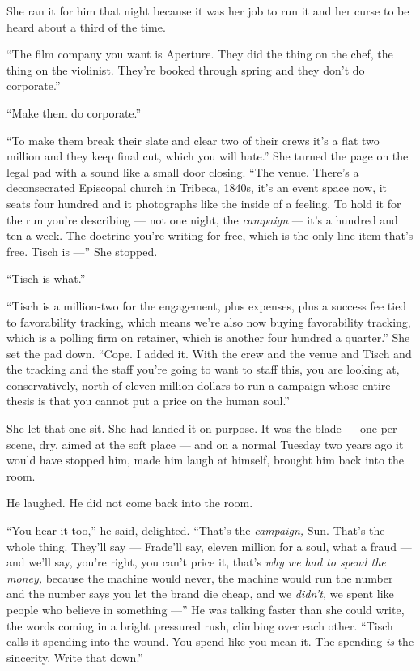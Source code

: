 \documentclass[11pt,openany]{book}
\newcommand{\scenebreak}{\par\vspace{0.5\baselineskip}\begin{center}\textasteriskcentered\quad\textasteriskcentered\quad\textasteriskcentered\end{center}\vspace{0.5\baselineskip}\par}
\begin{document}
\scenebreak


She ran it for him that night because it was her job to run it and her curse to be heard about a third of the time.

``The film company you want is Aperture. They did the thing on the chef, the thing on the violinist. They're booked through spring and they don't do corporate.''

``Make them do corporate.''

``To make them break their slate and clear two of their crews it's a flat two million and they keep final cut, which you will hate.'' She turned the page on the legal pad with a sound like a small door closing. ``The venue. There's a deconsecrated Episcopal church in Tribeca, 1840s, it's an event space now, it seats four hundred and it photographs like the inside of a feeling. To hold it for the run you're describing --- not one night, the \textit{campaign} --- it's a hundred and ten a week. The doctrine you're writing for free, which is the only line item that's free. Tisch is ---'' She stopped.

``Tisch is what.''

``Tisch is a million-two for the engagement, plus expenses, plus a success fee tied to favorability tracking, which means we're also now buying favorability tracking, which is a polling firm on retainer, which is another four hundred a quarter.'' She set the pad down. ``Cope. I added it. With the crew and the venue and Tisch and the tracking and the staff you're going to want to staff this, you are looking at, conservatively, north of eleven million dollars to run a campaign whose entire thesis is that you cannot put a price on the human soul.''

She let that one sit. She had landed it on purpose. It was the blade --- one per scene, dry, aimed at the soft place --- and on a normal Tuesday two years ago it would have stopped him, made him laugh at himself, brought him back into the room.

He laughed. He did not come back into the room.

``You hear it too,'' he said, delighted. ``That's the \textit{campaign,} Sun. That's the whole thing. They'll say --- Frade'll say, eleven million for a soul, what a fraud --- and we'll say, you're right, you can't price it, that's \textit{why we had to spend the money,} because the machine would never, the machine would run the number and the number says you let the brand die cheap, and we \textit{didn't,} we spent like people who believe in something ---'' He was talking faster than she could write, the words coming in a bright pressured rush, climbing over each other. ``Tisch calls it spending into the wound. You spend like you mean it. The spending \textit{is} the sincerity. Write that down.''
\end{document}
